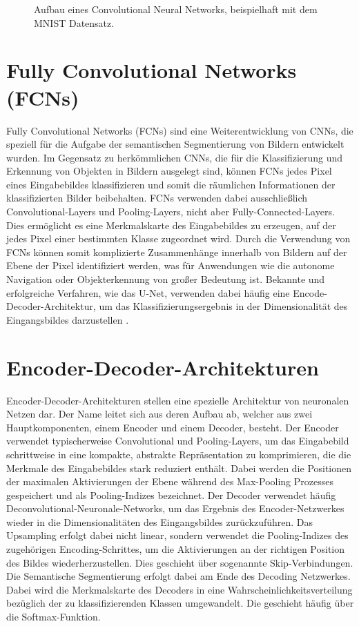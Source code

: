 \begin{figure}
    \centering
    
    \caption{Aufbau eines Convolutional Neural Networks, beispielhaft mit dem MNIST Datensatz.}
    \label{fig:CNN}
\end{figure}

\section{Fully Convolutional Networks (FCNs)}
Fully Convolutional Networks (FCNs) sind eine Weiterentwicklung von CNNs, die
speziell für die Aufgabe der semantischen Segmentierung von Bildern entwickelt
wurden. Im Gegensatz zu herkömmlichen CNNs, die für die Klassifizierung und
Erkennung von Objekten in Bildern ausgelegt sind, können FCNs jedes Pixel eines
Eingabebildes klassifizieren und somit die räumlichen Informationen der
klassifizierten Bilder beibehalten. FCNs verwenden dabei ausschließlich
Convolutional-Layers und Pooling-Layers, nicht aber Fully-Connected-Layers.
Dies ermöglicht es eine Merkmalskarte des Eingabebildes zu erzeugen, auf der
jedes Pixel einer bestimmten Klasse zugeordnet wird. Durch die Verwendung von
FCNs können somit komplizierte Zusammenhänge innerhalb von Bildern auf der
Ebene der Pixel identifiziert werden, was für Anwendungen wie die autonome
Navigation oder Objekterkennung von großer Bedeutung ist. \cite{7803544}
Bekannte und erfolgreiche Verfahren, wie das U-Net, verwenden dabei häufig eine
Encode-Decoder-Architektur, um das Klassifizierungsergebnis in der
Dimensionalität des Eingangsbildes darzustellen \cite{8309343}.

\section{Encoder-Decoder-Architekturen}
Encoder-Decoder-Architekturen stellen eine spezielle Architektur von neuronalen
Netzen dar. Der Name leitet sich aus deren Aufbau ab, welcher aus zwei
Hauptkomponenten, einem Encoder und einem Decoder, besteht. Der Encoder
verwendet typischerweise Convolutional und Pooling-Layers, um das Eingabebild
schrittweise in eine kompakte, abstrakte Repräsentation zu komprimieren, die
die Merkmale des Eingabebildes stark reduziert enthält. Dabei werden die
Positionen der maximalen Aktivierungen der Ebene während des Max-Pooling
Prozesses gespeichert und als Pooling-Indizes bezeichnet. Der Decoder verwendet
häufig Deconvolutional-Neuronale-Networks, um das Ergebnis des
Encoder-Netzwerkes wieder in die Dimensionalitäten des Eingangsbildes
zurückzuführen. Das Upsampling erfolgt dabei nicht linear, sondern verwendet
die Pooling-Indizes des zugehörigen Encoding-Schrittes, um die Aktivierungen an
der richtigen Position des Bildes wiederherzustellen. Dies geschieht über
sogenannte Skip-Verbindungen. Die Semantische Segmentierung erfolgt dabei am
Ende des Decoding Netzwerkes. Dabei wird die Merkmalskarte des Decoders in eine
Wahrscheinlichkeitsverteilung bezüglich der zu klassifizierenden Klassen
umgewandelt. Die geschieht häufig über die Softmax-Funktion. \cite{7803544}

